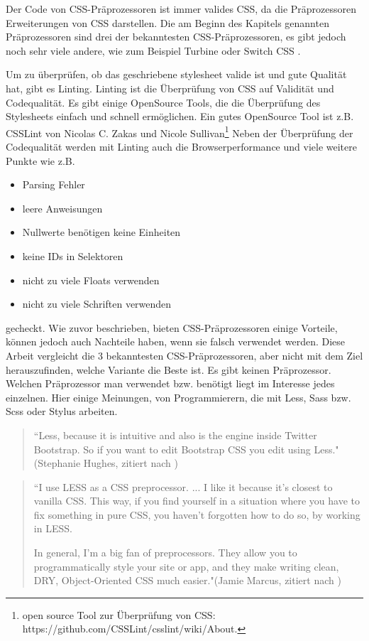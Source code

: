 Der Code von CSS-Präprozessoren ist immer valides CSS, da die Präprozessoren Erweiterungen von CSS darstellen. Die am Beginn des Kapitels genannten Präprozessoren sind drei der bekanntesten CSS-Präprozessoren, es gibt jedoch noch sehr viele andere, wie zum Beispiel Turbine oder Switch CSS \autocite[]{Jung.2010}.

Um zu überprüfen, ob das geschriebene stylesheet valide ist und gute Qualität hat, gibt es Linting. Linting ist die Überprüfung von CSS auf Validität und Codequalität. Es gibt einige OpenSource Tools, die die Überprüfung des Stylesheets einfach und schnell ermöglichen. Ein gutes OpenSource Tool ist z.B. CSSLint von Nicolas C. Zakas und Nicole Sullivan\footnote[1]{open source Tool zur Überprüfung von CSS: https://github.com/CSSLint/csslint/wiki/About.}\newline
Neben der Überprüfung der Codequalität werden mit Linting auch die Browserperformance und viele weitere Punkte wie z.B.
\begin{itemize}
  \item Parsing Fehler
  \item leere Anweisungen
  \item Nullwerte benötigen keine Einheiten
  \item keine IDs in Selektoren
  \item nicht zu viele Floats verwenden
  \item nicht zu viele Schriften verwenden
\end{itemize} 
gecheckt. \newline\newline
Wie zuvor beschrieben, bieten CSS-Präprozessoren einige Vorteile, können jedoch auch Nachteile haben,  wenn sie falsch verwendet werden. Diese Arbeit vergleicht die 3 bekanntesten CSS-Präprozessoren, aber nicht mit dem Ziel herauszufinden, welche Variante die Beste ist. Es gibt keinen \glqq{} Präprozessor.\newline
Welchen Präprozessor man verwendet bzw. benötigt liegt im Interesse jedes einzelnen. Hier einige Meinungen, von Programmierern, die mit Less, Sass bzw. Scss oder Stylus arbeiten. 
\begin{quote}
``Less, because it is intuitive and also is the engine inside Twitter Bootstrap. So if you want to edit Bootstrap CSS you edit using Less."(Stephanie Hughes, zitiert nach \cite[]{psdtowp.2014})
\end{quote} 
\begin{quote}
``I use LESS as a CSS preprocessor. ... I like it because it's closest to vanilla CSS. This way, if you find yourself in a situation where you have to fix something in pure CSS, you haven't forgotten how to do so, by working in LESS.

In general, I'm a big fan of preprocessors. They allow you to programmatically style your site or app, and they make writing clean, DRY, Object-Oriented CSS much easier."(Jamie Marcus, zitiert nach \cite[]{psdtowp.2014})
\end{quote} 
